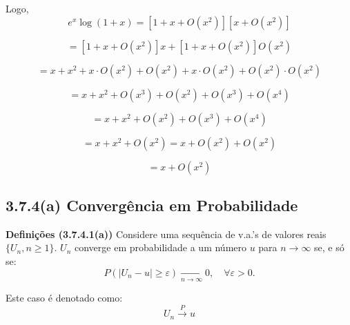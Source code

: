 Logo,
\begin{equation}
e^{x} \log(1+x) = \left[ 1 + x + O(x^2) \right] \left[ x + O(x^2) \right]
\end{equation}

\begin{equation}
= \left[ 1 + x + O(x^2) \right] x + \left[ 1 + x + O(x^2) \right] O(x^2)
\end{equation}

\begin{equation}
= x + x^2 + x \cdot O(x^2) + O(x^2) + x \cdot O(x^2) + O(x^2) \cdot O(x^2)
\end{equation}

\begin{equation}
= x + x^2 + O(x^3) + O(x^2) + O(x^3) + O(x^4)
\end{equation}

\begin{equation}
= x + x^2 + O(x^2) + O(x^3) + O(x^4)
\end{equation}

\begin{equation}
= x + x^2 + O(x^2) = x + O(x^2) + O(x^2)
\end{equation}

\begin{equation}
= x + O(x^2)
\end{equation}

\subsection*{3.7.4(a) Convergência em Probabilidade}

\textbf{Definições (3.7.4.1(a))} Considere uma sequência de v.a.'s de valores reais $\{U_n, n \geq 1\}$. $U_n$ converge em probabilidade a um número $u$ para $n \to \infty$ se, e só se:
\begin{equation}
P\left( |U_n - u| \geq \varepsilon \right) \xrightarrow[n \to \infty]{} 0, \quad \forall \varepsilon > 0.
\end{equation}

Este caso é denotado como:
\begin{equation}
U_n \xrightarrow{P} u
\end{equation}